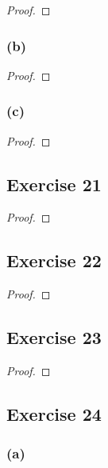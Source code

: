 \documentclass[14pt]{extarticle}
\begin{document}
\begin{proof}

\end{proof}

\subsubsection{(b)}

\begin{proof}

\end{proof}

\subsubsection{(c)}

\begin{proof}

\end{proof}

\subsection{Exercise 21}

\begin{proof}

\end{proof}

\subsection{Exercise 22}

\begin{proof}

\end{proof}

\subsection{Exercise 23}

\begin{proof}

\end{proof}

\subsection{Exercise 24}

\subsubsection{(a)}
\end{document}
